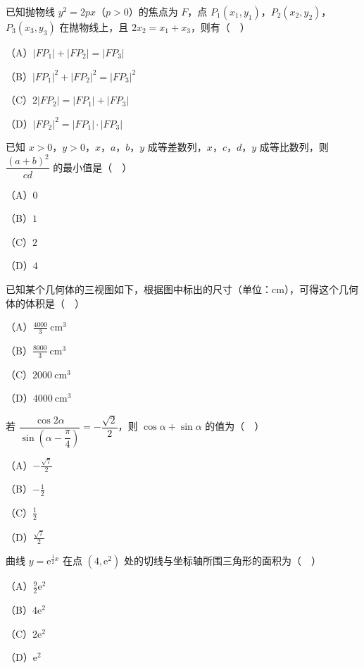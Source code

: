 \begin{question}
已知抛物线 $y^2=2px$（$p>0$）的焦点为 $F$，点 $P_1(x_1,y_1)$，$P_2(x_2,y_2)$，$P_3(x_3,y_3)$ 在抛物线上，且 $2x_2=x_1+x_3$，则有（　）

（A）$|FP_1|+|FP_2|=|FP_3|$

（B）$|FP_1|^2+|FP_2|^2=|FP_3|^2$

（C）$2|FP_2|=|FP_1|+|FP_3|$

（D）$|FP_2|^2=|FP_1|\cdot|FP_3|$

\end{question}
\begin{question}
已知 $x>0$，$y>0$，$x$，$a$，$b$，$y$ 成等差数列，$x$，$c$，$d$，$y$ 成等比数列，则 $\dfrac{(a+b)^2}{cd}$ 的最小值是（　）

（A）$0$

（B）$1$

（C）$2$

（D）$4$

\Needspace{0.4\textheight}
\end{question}
\begin{question}
已知某个几何体的三视图如下，根据图中标出的尺寸（单位：$\mathrm{cm}$），可得这个几何体的体积是（　）
\nopagebreak[4]
\begin{center}\end{center}
\nopagebreak[4]
（A）$\frac{4000}{3}\ \mathrm{cm^3}$

（B）$\frac{8000}{3}\ \mathrm{cm^3}$

（C）$2000\ \mathrm{cm^3}$

（D）$4000\ \mathrm{cm^3}$

\end{question}
\begin{question}
若 $\dfrac{\cos2\alpha}{\sin\left(\alpha-\dfrac{\pi}{4}\right)}=-\dfrac{\sqrt2}{2}$，则 $\cos\alpha+\sin\alpha$ 的值为（　）

（A）$-\frac{\sqrt7}{2}$

（B）$-\frac12$

（C）$\frac12$

（D）$\frac{\sqrt7}{2}$

\end{question}
\begin{question}
曲线 $y=\mathrm e^{\frac12x}$ 在点 $(4,\mathrm e^2)$ 处的切线与坐标轴所围三角形的面积为（　）

（A）$\frac92\mathrm e^2$

（B）$4\mathrm e^2$

（C）$2\mathrm e^2$

（D）$\mathrm e^2$

\end{question}
